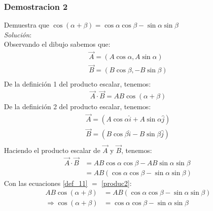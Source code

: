 \documentclass[12pt,openany]{book}
\begin{document}
			\subsubsection{Demostracion 2}
				\noindent Demuestra que $\cos(\alpha+\beta)=\cos\alpha\cos\beta-\sin\alpha\sin\beta$\\
				\noindent\textsl{Soluci\'on}:\\
				Observando el dibujo sabemos que:
				\begin{equation*}
					\begin{split}
						\vec{A}=(A\cos\alpha,A\sin\alpha)\\
						\vec{B}=(B\cos\beta,-B\sin\beta)\\
					\end{split}
				\end{equation*}
				De la definici\'on 1 del producto escalar, tenemos:\\
				\begin{equation}
					\begin{split}
						\vec{A}\cdot\vec{B}=AB\cos(\alpha+\beta)
						\label{def_11}
					\end{split}
				\end{equation}
				De la definici\'on 2 del producto escalar, tenemos:\\
				\begin{equation*}
					\begin{split}
						\vec{A}=(A\cos\alpha\hat{i} + A\sin\alpha\hat{j})\\
						\vec{B}=(B\cos\beta\hat{i} - B\sin\beta\hat{j})\\
					\end{split}
				\end{equation*}
				Haciendo el producto escalar de $\vec{A}$ y $\vec{B}$, tenemos:
				\begin{equation}
					\begin{split}
						\vec{A}\cdot\vec{B}&=AB\cos\alpha\cos\beta - AB\sin\alpha\sin\beta\\
						 										 &=AB(\cos\alpha\cos\beta - \sin\alpha\sin\beta)
						\label{produc2}
					\end{split}
				\end{equation}
				Con las ecuaciones \ref{def_11} $=$ \ref{produc2}:
				\begin{equation*}
					\begin{split}
						AB\cos(\alpha+\beta)&=AB(\cos\alpha\cos\beta - \sin\alpha\sin\beta)\\
						\Rightarrow \cos(\alpha+\beta)&=\cos\alpha\cos\beta - \sin\alpha\sin\beta
					\end{split}
				\end{equation*}			
\end{document}
